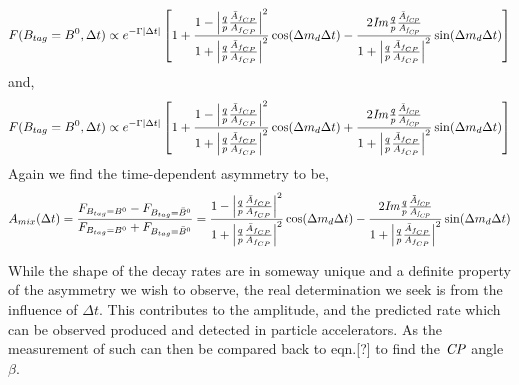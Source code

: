 \[F(B_{tag}=B^{0},\Delta t) \propto
 e^{-\Gamma |\Delta t|}
\left[1+\frac{1-\left|\frac{q}{p}\frac{\bar{A}_{f_{CP}}}{A_{f_{CP}}}
\right|^{2}}{1+\left|\frac{q}{p}\frac{\bar{A}_{f_{CP}}}{A_{f_{CP}}}\right|^{2}}\cos(\Delta m_{d}\Delta t) - 
\frac{2\it{I}m\frac{q}{p}\frac{\bar{A}_{f_{CP}}}{A_{f_{CP}}}}
{1+\left|\frac{q}{p}\frac{\bar{A}_{f_{CP}}}{A_{f_{CP}}}
\right|^{2}}
\sin(\Delta m_{d} \Delta t)\right]\]
and,
\[F(B_{tag}=B^{0},\Delta t) \propto
 e^{-\Gamma |\Delta t|}
\left[1+\frac{1-\left|\frac{q}{p}\frac{\bar{A}_{f_{CP}}}{A_{f_{CP}}}
\right|^{2}}{1+\left|\frac{q}{p}\frac{\bar{A}_{f_{CP}}}{A_{f_{CP}}}\right|^{2}}\cos(\Delta m_{d}\Delta t) + 
\frac{2\it{I}m\frac{q}{p}\frac{\bar{A}_{f_{CP}}}{A_{f_{CP}}}}
{1+\left|\frac{q}{p}\frac{\bar{A}_{f_{CP}}}{A_{f_{CP}}}
\right|^{2}}
\sin(\Delta m_{d} \Delta t)\right]\]
Again we find the time-dependent asymmetry to be,
\[A_{mix}(\Delta t) = \frac{F_{B_{tag}=B^0}-F_{B_{tag}=\bar{B}^0}}{F_{B_{tag}=B^0}+F_{B_{tag}=\bar{B}^0}} = \frac{1-\left|\frac{q}{p}\frac{\bar{A}_{f_{CP}}}{A_{f_{CP}}}
\right|^{2}}{1+\left|\frac{q}{p}\frac{\bar{A}_{f_{CP}}}{A_{f_{CP}}}\right|^{2}}\cos(\Delta m_{d}\Delta t) - 
\frac{2\it{I}m\frac{q}{p}\frac{\bar{A}_{f_{CP}}}{A_{f_{CP}}}}
{1+\left|\frac{q}{p}\frac{\bar{A}_{f_{CP}}}{A_{f_{CP}}}
\right|^{2}}
\sin(\Delta m_{d} \Delta t)\]

While the shape of the decay rates are in someway unique and a definite property of the asymmetry we wish to observe, the real determination we seek is from the influence of $\Delta t$. This contributes to the amplitude, and the predicted rate which can be observed produced and detected in particle accelerators. As the measurement of such can then be compared back to eqn.[?] to find the $\it{CP}$ angle $\beta$.


